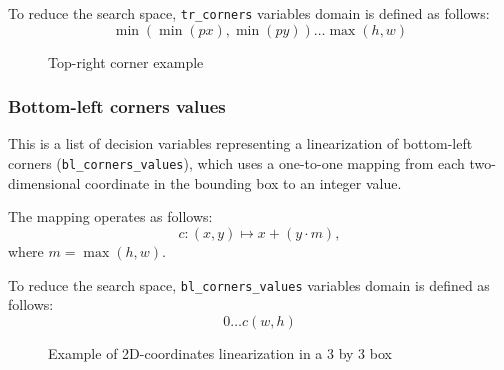 \documentclass[a4paper,10pt]{article}
\begin{document}
To reduce the search space, \texttt{tr\_corners} variables domain is defined as follows: $$\min({\min({px}), \min({py})}) \dots \max({h, w})$$

\begin{figure}[h]
   \centering
   \caption{Top-right corner example}
\end{figure}

\subsubsection*{Bottom-left corners values}
This is a list of decision variables representing a linearization of bottom-left corners (\texttt{bl\_corners\_values}), which uses a one-to-one mapping from each two-dimensional coordinate in the bounding box to an integer value.

The mapping operates as follows:
$$ c: (x,y) \mapsto x+(y\cdot m),$$ where $m = \max{(h,w)}$.

To reduce the search space, \texttt{bl\_corners\_values} variables domain is defined as follows: $$0 \dots c(w, h)$$

\begin{figure}[h]
   \centering
   \caption{Example of 2D-coordinates linearization in a 3 by 3 box}
\end{figure}
\end{document}
